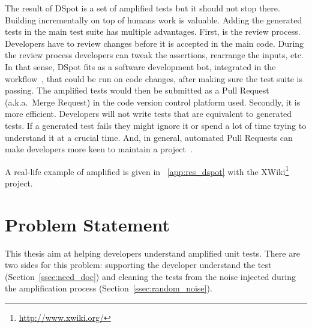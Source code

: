 \documentclass[a4paper,11pt]{sdm_internship}
\newcommand{\dspot}{DSpot\xspace}
\theoremstyle{definition}
\begin{document}
The result of \dspot{} is a set of amplified tests but it should not stop there.
Building incrementally on top of humans work is valuable.
Adding the generated tests in the main test suite has multiple advantages.
First, is the review process.
Developers have to review changes before it is accepted in the main code.
During the review process developers can tweak the assertions, rearrange the inputs, etc.
In that sense, \dspot{} fits as a software development bot, integrated in the workflow~\cite{urli2018design}, that could be run on code changes, after making sure the test suite is passing.
The amplified tests would then be submitted as a Pull Request (a.k.a.\ Merge Request) in the code version control platform used.
Secondly, it is more efficient.
Developers will not write tests that are equivalent to generated tests.
If a generated test fails they might ignore it or spend a lot of time trying to understand it at a crucial time.
And, in general, automated Pull Requests can make developers more keen to maintain a project~\cite{mirhosseini2017can}.

A real-life example of amplified is given in \appendixname~\ref{app:res_dspot} with the XWiki\footnote{\url{http://www.xwiki.org/}} project.


\section{Problem Statement}%
\label{sec:problem_statement}
This thesis aim at helping developers understand amplified unit tests.
There are two sides for this problem: supporting the developer understand the test (Section~\ref{ssec:need_doc}) and cleaning the tests from the noise injected during the amplification process (Section~\ref{ssec:random_noise}).

\end{document}
